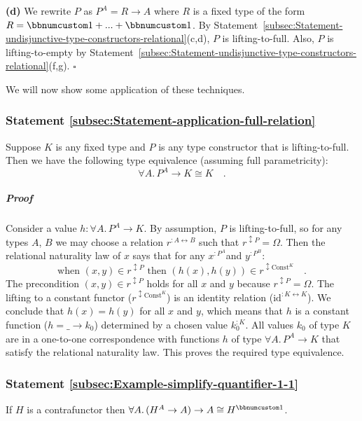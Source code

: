 \textbf{(d)} We rewrite $P$ as $P^{A}=R\rightarrow A$ where $R$
is a fixed type of the form $R=\bbnum 1+...+\bbnum 1$. By Statement~\ref{subsec:Statement-undisjunctive-type-constructors-relational}(c,d),
$P$ is lifting-to-full. Also, $P$ is lifting-to-empty by Statement~\ref{subsec:Statement-undisjunctive-type-constructors-relational}(f,g).
$\square$

We will now show some application of these techniques.

\subsubsection{Statement \label{subsec:Statement-application-full-relation}\ref{subsec:Statement-application-full-relation}}

Suppose $K$ is any fixed type and $P$ is any type constructor that
is lifting-to-full. Then we have the following type equivalence (assuming
full parametricity):
\[
\forall A.\,P^{A}\rightarrow K\cong K\quad.
\]


\subparagraph{Proof}

Consider a value $h:\forall A.\,P^{A}\rightarrow K$. By assumption,
$P$ is lifting-to-full, so for any types $A$, $B$ we may choose
a relation $r^{:A\leftrightarrow B}$ such that $r^{\updownarrow P}=\Omega$.
Then the relational naturality law of $x$ says that for any $x^{:P^{A}}$and
$y^{:P^{B}}$:
\[
\text{when }(x,y)\in r^{\updownarrow P}\text{ then }(h(x),h(y))\in r^{\updownarrow\text{Const}^{K}}\quad.
\]
The precondition $(x,y)\in r^{\updownarrow P}$ holds for all $x$
and $y$ because $r^{\updownarrow P}=\Omega$. The lifting to a constant
functor ($r^{\updownarrow\text{Const}^{K}}$) is an identity relation
($\text{id}^{:K\leftrightarrow K}$). We conclude that $h(x)=h(y)$
for all $x$ and $y$, which means that $h$ is a constant function
($h=\_\rightarrow k_{0}$) determined by a chosen value $k_{0}^{:K}$.
All values $k_{0}$ of type $K$ are in a one-to-one correspondence
with functions $h$ of type $\forall A.\,P^{A}\rightarrow K$ that
satisfy the relational naturality law. This proves the required type
equivalence. 

\subsubsection{Statement \label{subsec:Example-simplify-quantifier-1-1}\ref{subsec:Example-simplify-quantifier-1-1}}

If $H$ is a contrafunctor then $\forall A.\,(H^{A}\rightarrow A)\rightarrow A\cong H^{\bbnum 1}$.

